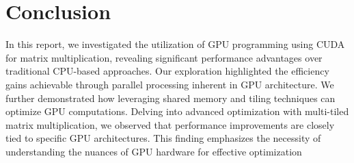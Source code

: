 \documentclass{article}
\begin{document}
\section{Conclusion}
In this report, we investigated the utilization of GPU programming using CUDA for matrix multiplication, 
revealing significant performance advantages over traditional CPU-based approaches. 
Our exploration highlighted the efficiency gains achievable through parallel processing inherent in GPU architecture. 
We further demonstrated how leveraging shared memory and tiling techniques can optimize GPU computations. Delving into advanced optimization with multi-tiled matrix multiplication, 
we observed that performance improvements are closely tied to specific GPU architectures. 
This finding emphasizes the necessity of understanding the nuances of GPU hardware for effective optimization
\end{document}
